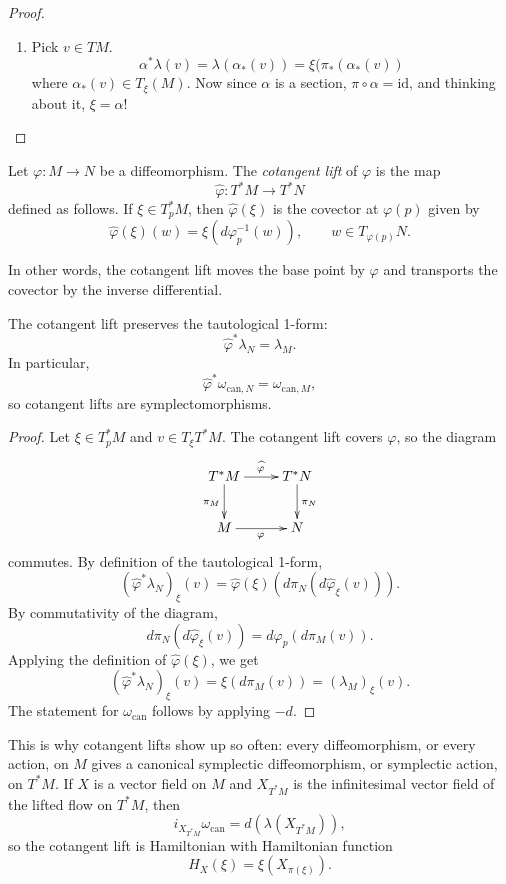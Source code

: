 \begin{proof}
\begin{enumerate}
\item Pick $v \in TM$.
$$
\alpha^*\lambda(v)=\lambda(\alpha_*(v))
=\xi(\pi_*(\alpha_*(v))
$$
where $\alpha_*(v) \in T_\xi(M)$.
Now since $\alpha$ is a section,
$\pi \circ \alpha=\text{id}$,
and thinking about it, $\xi=\alpha$!
\end{enumerate}
\end{proof}

\begin{definition}
\label{definition-cotangent-lift}
Let $\varphi:M \to N$ be a diffeomorphism.
The {\it cotangent lift} of $\varphi$ is
the map
$$
\widehat{\varphi}:T^*M \longrightarrow T^*N
$$
defined as follows.
If $\xi \in T_p^*M$, then
$\widehat{\varphi}(\xi)$ is the covector at
$\varphi(p)$ given by
$$
\widehat{\varphi}(\xi)(w)
=\xi(d\varphi_p^{-1}(w)),
\qquad w \in T_{\varphi(p)}N.
$$
\end{definition}

\noindent
In other words, the cotangent lift moves
the base point by $\varphi$ and transports
the covector by the inverse differential.

\begin{proposition}
\label{proposition-cotangent-lift-symplectic}
The cotangent lift preserves the tautological
1-form:
$$
\widehat{\varphi}^*\lambda_N=\lambda_M.
$$
In particular,
$$
\widehat{\varphi}^*\omega_{\text{can},N}
=\omega_{\text{can},M},
$$
so cotangent lifts are symplectomorphisms.
\end{proposition}

\begin{proof}
Let $\xi \in T_p^*M$ and
$v \in T_\xi T^*M$.
The cotangent lift covers $\varphi$, so the
diagram
$$
\xymatrix{
T^*M \ar[r]^{\widehat{\varphi}}
\ar[d]_{\pi_M}
& T^*N \ar[d]^{\pi_N} \\
M \ar[r]_{\varphi} & N
}
$$
commutes.
By definition of the tautological 1-form,
$$
(\widehat{\varphi}^*\lambda_N)_\xi(v)
=\widehat{\varphi}(\xi)
\left(
d\pi_N(d\widehat{\varphi}_\xi(v))
\right).
$$
By commutativity of the diagram,
$$
d\pi_N(d\widehat{\varphi}_\xi(v))
=d\varphi_p(d\pi_M(v)).
$$
Applying the definition of
$\widehat{\varphi}(\xi)$,
we get
$$
(\widehat{\varphi}^*\lambda_N)_\xi(v)
=\xi(d\pi_M(v))=(\lambda_M)_\xi(v).
$$
The statement for $\omega_{\text{can}}$
follows by applying $-d$.
\end{proof}

\noindent
This is why cotangent lifts show up so often:
every diffeomorphism, or every action, on $M$
gives a canonical symplectic
diffeomorphism, or symplectic action,
on $T^*M$.
If $X$ is a vector field on $M$ and
$X_{T^*M}$ is the infinitesimal vector
field of the lifted flow on $T^*M$, then
$$
i_{X_{T^*M}}\omega_{\text{can}}
=d\left(\lambda(X_{T^*M})\right),
$$
so the cotangent lift is Hamiltonian with
Hamiltonian function
$$
H_X(\xi)=\xi(X_{\pi(\xi)}).
$$

